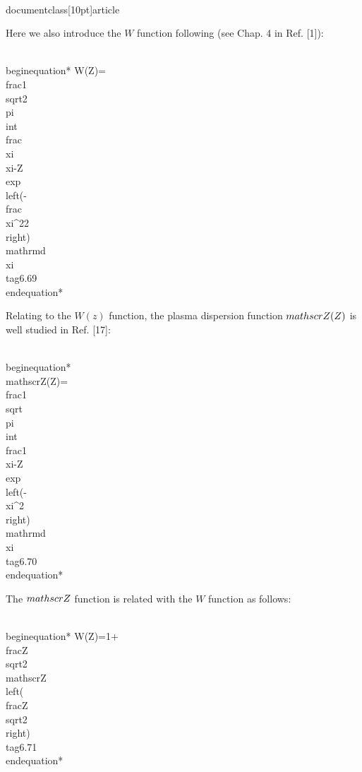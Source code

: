 \\documentclass[10pt]{article}
\begin{document}
{{{{Here we also introduce the $W$ function following (see Chap. 4 in Ref. [1]):


\\begin{equation*}
W(Z)=\\frac{1}{\\sqrt{2 \\pi}} \\int \\frac{\\xi}{\\xi-Z} \\exp \\left(-\\frac{\\xi^{2}}{2}\\right) \\mathrm{d} \\xi \\tag{6.69}
\\end{equation*}


Relating to the $W(z)$ function, the plasma dispersion function $\\mathscr{Z}(Z)$ is well studied in Ref. [17]:


\\begin{equation*}
\\mathscr{Z}(Z)=\\frac{1}{\\sqrt{\\pi}} \\int \\frac{1}{\\xi-Z} \\exp \\left(-\\xi^{2}\\right) \\mathrm{d} \\xi \\tag{6.70}
\\end{equation*}


The $\\mathscr{Z}$ function is related with the $W$ function as follows:


\\begin{equation*}
W(Z)=1+\\frac{Z}{\\sqrt{2}} \\mathscr{Z}\\left(\\frac{Z}{\\sqrt{2}}\\right) \\tag{6.71}
\\end{equation*}


}}}}
\end{document}
